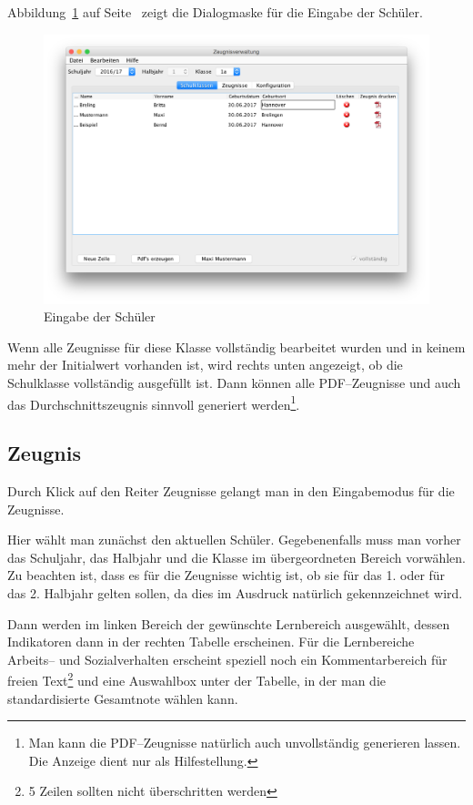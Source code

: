 \documentclass[a4paper,notitlepage,parskip]{scrartcl}
\newcommand\ott{\normalfont\ttfamily}
\begin{document}
Abbildung~\ref{fig:Schulklassen} auf Seite~\pageref{fig:Schulklassen} zeigt die Dialogmaske für die Eingabe der Schüler.

\begin{figure}[ht]
\centering
\centerline{\includegraphics[width=1.0\textwidth]{Schulklassen}}
\caption{Eingabe der Schüler}
\label{fig:Schulklassen}
\end{figure}

Wenn alle Zeugnisse für diese Klasse vollständig bearbeitet wurden und in keinem mehr der Initialwert vorhanden ist, wird rechts unten angezeigt, ob die Schulklasse vollständig ausgefüllt ist.
Dann können alle PDF--Zeugnisse und auch das Durchschnittszeugnis sinnvoll generiert werden\footnote{Man kann die PDF--Zeugnisse natürlich auch unvollständig generieren lassen. Die Anzeige dient nur als Hilfestellung.}.

\subsection{Zeugnis}
Durch Klick auf den Reiter {\ott Zeugnisse} gelangt man in den Eingabemodus für die Zeugnisse.

Hier wählt man zunächst den aktuellen Schüler.
Gegebenenfalls muss man vorher das Schuljahr, das Halbjahr und die Klasse im übergeordneten Bereich vorwählen.
Zu beachten ist, dass es für die Zeugnisse wichtig ist, ob sie für das 1. oder für das 2. Halbjahr gelten sollen, da dies im Ausdruck natürlich gekennzeichnet wird.

Dann werden im linken Bereich der gewünschte Lernbereich ausgewählt, dessen Indikatoren dann in der rechten Tabelle erscheinen.
Für die Lernbereiche Arbeits-- und Sozialverhalten erscheint speziell noch ein Kommentarbereich für freien Text\footnote{5 Zeilen sollten nicht überschritten werden} und eine Auswahlbox unter der Tabelle, in der man die standardisierte Gesamtnote wählen kann. 
\end{document}
